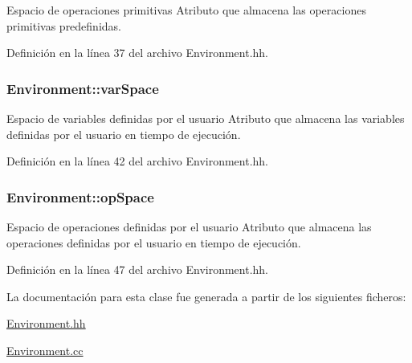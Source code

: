 Espacio de operaciones primitivas Atributo que almacena las operaciones primitivas predefinidas. 



Definición en la línea 37 del archivo Environment.\+hh.

\subsubsection[{\texorpdfstring{var\+Space}{varSpace}}]{ Environment\+::var\+Space\hspace{0.3cm}{\ttfamily [private]}}\hypertarget{class_environment_aedf0507f98713f9eb6c152d93c346aa4}{}\label{class_environment_aedf0507f98713f9eb6c152d93c346aa4}


Espacio de variables definidas por el usuario Atributo que almacena las variables definidas por el usuario en tiempo de ejecución. 



Definición en la línea 42 del archivo Environment.\+hh.

\subsubsection[{\texorpdfstring{op\+Space}{opSpace}}]{ Environment\+::op\+Space\hspace{0.3cm}{\ttfamily [private]}}\hypertarget{class_environment_a7ab0af9a002f7df22966678a0dd0c366}{}\label{class_environment_a7ab0af9a002f7df22966678a0dd0c366}


Espacio de operaciones definidas por el usuario Atributo que almacena las operaciones definidas por el usuario en tiempo de ejecución. 



Definición en la línea 47 del archivo Environment.\+hh.



La documentación para esta clase fue generada a partir de los siguientes ficheros\+:\begin{DoxyCompactItemize}
\item 
\hyperlink{_environment_8hh}{Environment.\+hh}\item 
\hyperlink{_environment_8cc}{Environment.\+cc}\end{DoxyCompactItemize}
